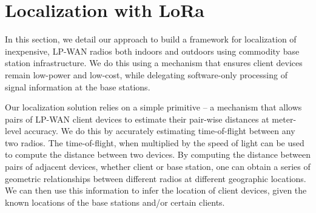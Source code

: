 \section{Localization with LoRa}
\label{sec:localization}




In this section, we detail our approach to build a framework for localization of inexpensive, LP-WAN radios both indoors and outdoors using commodity base station infrastructure. We do this using a mechanism that ensures client devices remain low-power and low-cost, while delegating software-only processing of signal information at the base stations. 

Our localization solution relies on a simple primitive -- a mechanism that allows pairs of LP-WAN client devices to estimate their pair-wise distances at meter-level accuracy. We do this by accurately estimating time-of-flight between any two radios. The time-of-flight, when multiplied by the speed of light can be used to compute the distance between two devices. By computing the distance between pairs of adjacent devices, whether client or base station, one can obtain a series of geometric relationships between different radios at different geographic locations. We can then use this information to infer the location of client devices, given the known locations of the base stations and/or certain clients.  


